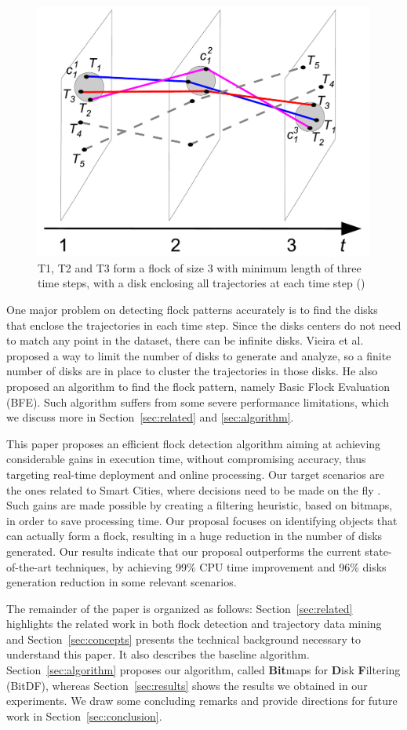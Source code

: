 \begin{figure}
    \centering
    \includegraphics[width=0.7\linewidth]{images/flock_pattern.png}
    \caption{T1, T2 and T3 form a flock of size 3 with minimum length of three time steps, with a disk enclosing all
        trajectories at each time step (\hspace{-0.005cm}\citep{vieira})}
    \label{fig:flocks}
\end{figure}

One major problem on detecting flock patterns accurately is to find the disks that enclose the trajectories in each time
step. Since the disks centers do not need to match any point in the dataset, there can be infinite disks. Vieira et al.
\citep{vieira} proposed a way to limit the number of disks to generate and analyze, so a finite number of disks are
in place to cluster the trajectories in those disks. He also proposed an algorithm to find the flock pattern, namely
Basic Flock Evaluation (BFE). Such algorithm suffers from some severe performance limitations, which we discuss more in
Section~\ref{sec:related} and \ref{sec:algorithm}.

This paper proposes an efficient flock detection algorithm aiming at achieving considerable gains in execution time,
without compromising accuracy, thus targeting real-time deployment and online processing. Our target scenarios are the
ones related to Smart Cities, where decisions need to be made on the fly
\citep{ieeesmartcities}\citep{springersmartcities}. Such gains are made possible by creating a filtering
heuristic, based on bitmaps, in order to save processing time. Our proposal focuses on identifying objects that can
actually form a flock, resulting in a huge reduction in the number of disks generated. Our results indicate that our
proposal outperforms the current state-of-the-art techniques, by achieving 99\% CPU time improvement and 96\% disks
generation reduction in some relevant scenarios.

The remainder of the paper is organized as follows: Section~\ref{sec:related} highlights the related work in both flock
detection and trajectory data mining and Section~\ref{sec:concepts} presents the technical background necessary to
understand this paper. It also describes the baseline algorithm. Section~\ref{sec:algorithm} proposes our algorithm,
called \textbf{Bit}maps for \textbf{D}isk \textbf{F}iltering (BitDF), whereas Section~\ref{sec:results} shows the
results we obtained in our experiments. We draw some concluding remarks and provide directions for future work in
Section~\ref{sec:conclusion}.
